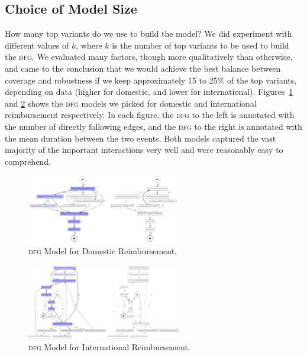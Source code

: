 \documentclass[conference]{IEEEtran}
\begin{document}
\subsection{Choice of Model Size}

How many top variants do we use to build the model?
We did experiment with different values of $k$, where $k$ is the number of
top variants to be used to build the \textsc{dfg}. We
evaluated many factors, though more qualitatively than otherwise,
and came to the conclusion
that we would achieve the best balance between coverage and robustness if
we keep approximately 15 to 25\% of the top variants, depending on data
(higher for domestic, and lower for international). Figures~\ref{fig-domestic}
and \ref{fig-international} shows the \textsc{dfg} models we picked for
domestic and international reimbursement respectively. In each figure,
the \textsc{dfg} to the left is annotated with the number of directly following
edges, and the \textsc{dfg} to the right is annotated with the mean duration between
the two events. Both models captured the vast majority of the important
interactions very well and were reasonably easy to comprehend.

\begin{figure}[htbp]
\centerline{\includegraphics[width=0.60\textwidth]{images/domestic.png}}
\caption{\textsc{dfg} Model for Domestic Reimbursement.}
\label{fig-domestic}
\end{figure}
\vspace{-1em}

\begin{figure}[htbp]
\centerline{\includegraphics[width=0.60\textwidth]{images/international.png}}
\caption{\textsc{dfg} Model for International Reimbursement.}
\label{fig-international}
\end{figure}
\vspace{-1em}
\end{document}
